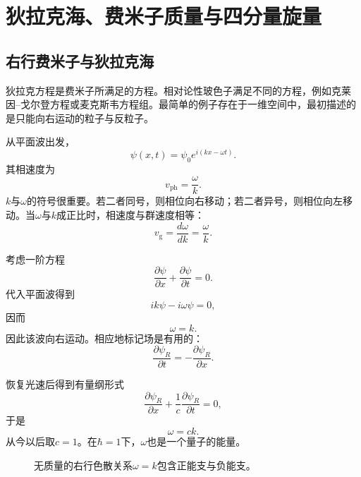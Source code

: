 \chapter{狄拉克海、费米子质量与四分量旋量}

\section{右行费米子与狄拉克海}

狄拉克方程是费米子所满足的方程。相对论性玻色子满足不同的方程，例如克莱因--戈尔登方程或麦克斯韦方程组。最简单的例子存在于一维空间中，最初描述的是只能向右运动的粒子与反粒子。

从平面波出发，
\begin{equation}
\psi(x,t)=\psi_0 e^{i(kx-\omega t)}.
\end{equation}
其相速度为
\begin{equation}
v_{\mathrm{ph}}=\frac{\omega}{k}.
\end{equation}
\(k\)与\(\omega\)的符号很重要。若二者同号，则相位向右移动；若二者异号，则相位向左移动。当\(\omega\)与\(k\)成正比时，相速度与群速度相等：
\begin{equation}
v_{\mathrm{g}}=\frac{d\omega}{dk}=\frac{\omega}{k}.
\end{equation}

考虑一阶方程
\begin{equation}
\frac{\partial\psi}{\partial x}
+
\frac{\partial\psi}{\partial t}
=0.
\end{equation}
代入平面波得到
\begin{equation}
ik\psi-i\omega\psi=0,
\end{equation}
因而
\begin{equation}
\omega=k.
\end{equation}
因此该波向右运动。相应地标记场是有用的：
\begin{equation}
\frac{\partial\psi_R}{\partial t}
=
-\frac{\partial\psi_R}{\partial x}.
\end{equation}

恢复光速后得到有量纲形式
\begin{equation}
\frac{\partial\psi_R}{\partial x}
+
\frac{1}{c}\frac{\partial\psi_R}{\partial t}
=0,
\end{equation}
于是
\begin{equation}
\omega=ck.
\end{equation}
从今以后取\(c=1\)。在\(\hbar=1\)下，\(\omega\)也是一个量子的能量。

\begin{figure}[htbp]
\centering
{}
\caption{无质量的右行色散关系\(\omega=k\)包含正能支与负能支。}
\end{figure}


